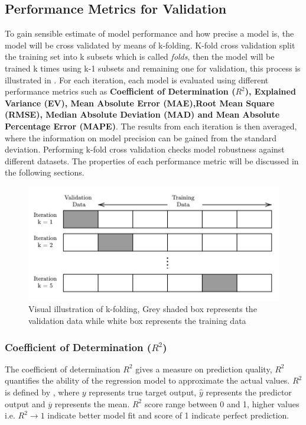 \subsection{Performance Metrics for Validation}\label{sec:perf_metrics}

To gain sensible estimate of model performance and how precise a model is, the model will be cross validated by means of k-folding. K-fold cross validation split the training set into k subsets which is called \emph{folds}, then the model will be trained k times using k-1 subsets and remaining one for validation, this process is illustrated in . For each iteration, each model is evaluated using different performance metrics such as \textbf{Coefficient of Determination ($R^2$), Explained Variance (EV), Mean Absolute Error (MAE),Root Mean Square (RMSE), Median Absolute Deviation (MAD) and Mean Absolute Percentage Error (MAPE)}. The results from each iteration is then averaged, where the information on model precision can be gained from the standard deviation. Performing k-fold cross validation checks model robustness against different datasets. The properties of each performance metric will be discussed in the following sections.

\begin{figure}
    \centering
    \includegraphics[width=.85\textwidth]{02_figures/kfold.png}
    \caption{Visual illustration of k-folding, Grey shaded box represents the validation data while white box represents the training data}
    \label{fig:kfold}
\end{figure}

\subsubsection*{Coefficient of Determination ({$R^2$})}\label{sec:rsquared}

The coefficient of determination $R^2$ gives a measure on prediction quality, $R^2$ quantifies the ability of the regression model to approximate the actual values. $R^2 $ is defined by , where $y$ represents true target output, $\hat{y}$ represents the predictor output and $\overline{y}$ represents the mean. $R^2$ score range between 0 and 1, higher values i.e. $R^2 \rightarrow 1$ indicate better model fit and score of 1 indicate perfect prediction.\\

